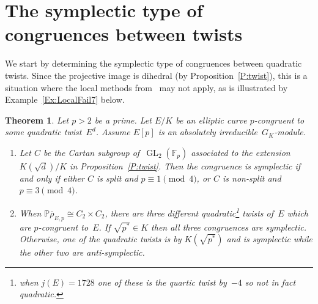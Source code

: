 \documentclass[12pt, reqno]{amsart}
\newcommand{\F}{\mathbb{F}}
\newcommand{\PP}{\mathbb{P}}
\newcommand{\rhobar}{{\overline{\rho}}}
\newcommand{\GL}{\operatorname{GL}}
\numberwithin{equation}{section}
\newtheorem{theorem}{Theorem}[section]
\theoremstyle{definition}
\theoremstyle{remark}
\begin{document}

\section{The symplectic type of congruences between twists} \label{S:type}


We start by determining the symplectic type of congruences between quadratic twists.
Since the projective
image is dihedral (by Proposition~\ref{P:twist}), this
is a situation where the local methods from~\cite{FKSym} may not
apply, as is illustrated by Example~\ref{Ex:LocalFail7} below.

\begin{theorem}\label{T:quadratic} 
Let $p > 2$ be a prime. 
Let $E/K$ be an elliptic curve 
$p$-congruent to some quadratic twist~$E^d$.
Assume $E[p]$ is an absolutely irreducible~$G_K$-module.

\begin{enumerate}

\item Let $C$ be the Cartan subgroup of~$\GL_2(\F_p)$
  associated to the extension $K(\sqrt{d})/K$ in
  Proposition~\ref{P:twist}.  Then the congruence is symplectic if and
  only if \emph{either} $C$ is split and $p \equiv 1 \pmod{4}$,
  \emph{or} $C$ is non-split and $p \equiv 3 \pmod{4}$.

\item When $\PP\rhobar_{E,p}\cong C_2\times C_2$, there are three
  different quadratic\footnote{when $j(E)=1728$ one of these
    is the quartic twist by~$-4$ so not in fact quadratic.}  twists
    of~$E$ which are $p$-congruent to~$E$.  If $\sqrt{p^*}\in K$ then
    all three congruences are symplectic.  Otherwise, one of the
    quadratic twists is by $K(\sqrt{p^*})$ and is symplectic while the
    other two are anti-symplectic.
\end{enumerate}
\end{theorem}
\end{document}
